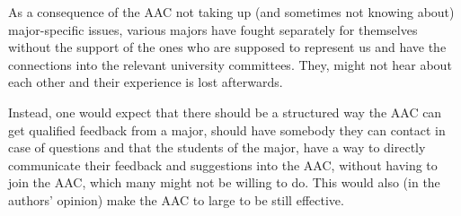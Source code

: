 As a consequence of the AAC not taking up (and sometimes not knowing about) major-specific issues, various majors have fought separately for themselves without the support of the ones who are supposed to represent us and have the connections into the relevant university committees. They, might not hear about each other and their experience is lost afterwards. 

Instead, one would expect that there should be a structured way the AAC can get qualified feedback from a major, should have somebody they can contact in case of questions and that the students of the major, have a way to directly communicate their feedback and suggestions into the AAC, without having to join the AAC, which many might not be willing to do. This would also (in the authors' opinion) make the AAC to large to be still effective. 